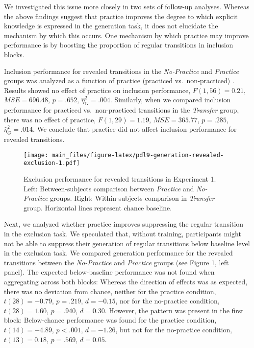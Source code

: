 \documentclass[floatsintext,doc]{apa6}
\theoremstyle{definition}
\theoremstyle{definition}
\theoremstyle{definition}
\theoremstyle{remark}
\begin{document}
We investigated this issue more closely in two sets of follow-up
analyses. Whereas the above findings suggest that practice improves the
degree to which explicit knowledge is expressed in the generation task,
it does not elucidate the mechanism by which this occurs. One mechanism
by which practice may improve performance is by boosting the proportion
of regular transitions in inclusion blocks.

Inclusion performance for revealed transitions in the \emph{No-Practice}
and \emph{Practice} groups was analyzed as a function of practice
(practiced vs.~non-practiced) . Results showed no effect of practice on
inclusion performance, \(F(1, 56) = 0.21\), \(\mathit{MSE} = 696.48\),
\(p = .652\), \(\hat{\eta}^2_G = .004\). Similarly, when we compared
inclusion performance for practiced vs.~non-practiced transitions in the
\emph{Transfer} group, there was no effect of practice,
\(F(1, 29) = 1.19\), \(\mathit{MSE} = 365.77\), \(p = .285\),
\(\hat{\eta}^2_G = .014\). We conclude that practice did not affect
inclusion performance for revealed transitions.

\begin{figure}
\centering
\texttt{[image: main\_files/figure-latex/pdl9-generation-revealed-exclusion-1.pdf]}
\caption{\label{fig:pdl9-generation-revealed-exclusion}Exclusion performance
for revealed transitions in Experiment 1. Left: Between-subjects
comparison between \emph{Practice} and \emph{No-Practice} groups. Right:
Within-subjects comparison in \emph{Transfer} group. Horizontal lines
represent chance baseline.}
\end{figure}

Next, we analyzed whether practice improves suppressing the regular
transition in the exclusion task. We speculated that, without training,
participants might not be able to suppress their generation of regular
transitions below baseline level in the exclusion task. We compared
generation performance for the revealed transitions between the
\emph{No-Practice} and \emph{Practice} groups (see Figure
\ref{fig:pdl9-generation-revealed-exclusion}, left panel). The expected
below-baseline performance was not found when aggregating across both
blocks: Whereas the direction of effects was as expected, there was no
deviation from chance, neither for the practice condition,
\(t(28) = -0.79\), \(p = .219\), \(d = -0.15\), nor for the no-practice
condition, \(t(28) = 1.60\), \(p = .940\), \(d = 0.30\). However, the
pattern was present in the first block: Below-chance performance was
found for the practice condition, \(t(14) = -4.89\), \(p < .001\),
\(d = -1.26\), but not for the no-practice condition, \(t(13) = 0.18\),
\(p = .569\), \(d = 0.05\).
\end{document}

